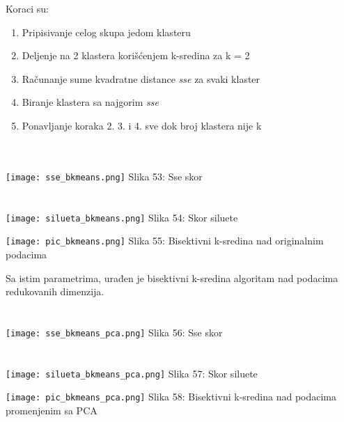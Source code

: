 \documentclass[a4paper]{article}
\begin{document}
{\noindent\begin{minipage}{0.4\textwidth}
Koraci su:
\begin{enumerate}
\item Pripisivanje celog skupa jedom klasteru
\item Deljenje na 2 klastera korišćenjem k-sredina za k = 2
\item Računanje sume kvadratne distance {\em sse} za svaki klaster
\item Biranje klastera sa najgorim {\em sse}
\item Ponavljanje koraka 2. 3. i 4. sve dok broj klastera nije k
\end{enumerate}
\vphantom{a}\\
\vphantom{a}\\
\texttt{[image: sse\_bkmeans.png]}
\hphantom{aaaaaaaaa}Slika 53: Sse skor\\
\vphantom{a}\\
\vphantom{a}\\
\texttt{[image: silueta\_bkmeans.png]}
\hphantom{aaaaaaaa}Slika 54: Skor siluete\\
\end{minipage}
\noindent\begin{minipage}{0.05\textwidth}
\hphantom{a}
\end{minipage}
\noindent\begin{minipage}{0.48\textwidth}
\texttt{[image: pic\_bkmeans.png]}
Slika 55: Bisektivni k-sredina nad originalnim podacima\\
\end{minipage}

\noindent\begin{minipage}{0.4\textwidth}
Sa istim parametrima, urađen je bisektivni k-sredina algoritam nad podacima redukovanih dimenzija.\\
\vphantom{a}\\
\vphantom{a}\\
\texttt{[image: sse\_bkmeans\_pca.png]}
\hphantom{aaaaaaaaa}Slika 56: Sse skor\\
\vphantom{a}\\
\vphantom{a}\\
\texttt{[image: silueta\_bkmeans\_pca.png]}
\hphantom{aaaaaaaa}Slika 57: Skor siluete\\
\end{minipage}
\noindent\begin{minipage}{0.05\textwidth}
\hphantom{a}
\end{minipage}
\noindent\begin{minipage}{0.48\textwidth}
\texttt{[image: pic\_bkmeans\_pca.png]}
Slika 58: Bisektivni k-sredina nad podacima promenjenim sa PCA\\
\end{minipage}

}
\end{document}
